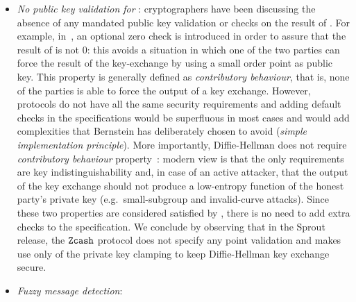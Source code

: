 \begin{itemize}
    \item \emph{No public key validation for} : cryptographers have been discussing the absence of any mandated public key validation or checks on the result of . For example, in~\cite[Section 6.1]{rfc7748}, an optional zero check is introduced in order to assure that the result of  is not $0$: this avoids a situation in which one of the two parties can force the result of the key-exchange by using a small order point as public key. This property is generally defined as \emph{contributory behaviour}, that is, none of the parties is able to force the output of a key exchange. However, protocols do not have all the same security requirements and adding default checks in the  specifications would be superfluous in most cases and would add complexities that Bernstein has deliberately chosen to avoid (\emph{simple implementation principle}). More importantly, Diffie-Hellman does not require \emph{contributory behaviour} property~\cite{trevorzerocheckcritique}: modern view is that the only requirements are key indistinguishability and, in case of an active attacker, that the output of the key exchange should not produce a low-entropy function of the honest party's private key (e.g.~small-subgroup and invalid-curve attacks). Since these two properties are considered satisfied by , there is no need to add extra checks to the  specification. We conclude by observing that in the Sprout release, the $\texttt{Zcash}{}$ protocol does not specify any point validation and makes use only of the private key clamping to keep Diffie-Hellman key exchange secure.
    \item \emph{Fuzzy message detection}:
\end{itemize}
